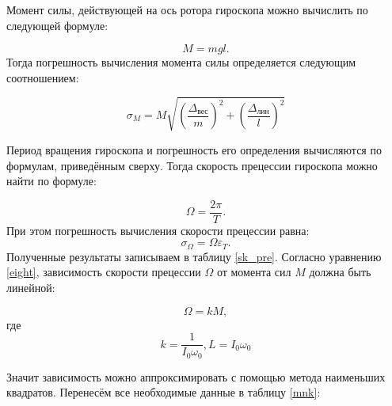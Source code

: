\documentclass[a4paper, 12pt]{article}
\begin{document}
\begin{center}
    Момент силы, действующей на ось ротора гироскопа можно вычислить по следующей формуле:

    \begin{equation}
        M = mgl.
    \end{equation}
    Тогда погрешность вычисления момента силы определяется следующим соотношением:
    
    \begin{equation}
        \sigma_M = M\sqrt{\left( \frac{\Delta_\text{вес}}{m} \right)^2 + \left( \frac{\Delta_\text{лин}}{l} \right)^2}
    \end{equation}
    
    Период вращения гироскопа и погрешность его определения вычисляются по формулам, приведённым сверху.
    Тогда скорость прецессии гироскопа можно найти по формуле:
    
    \begin{equation}
        \Omega = \frac{2\pi}{T}.
    \end{equation}
    При этом погрешность вычисления скорости прецессии равна:
    \begin{equation}
        \sigma_\Omega = \Omega \varepsilon_T.
    \end{equation}
    Полученные результаты записываем в таблицу \ref{sk_pre}.
    \bigskip
    Согласно уравнению \eqref{eight}, зависимость скорости прецессии $ \Omega $ от момента сил $ M $ должна быть линейной:
    
    \begin{equation}
        \Omega = kM,
    \end{equation}
    где
    \begin{equation}
        k = \frac{1}{I_0\omega_0}, L = I_0\omega_0
    \end{equation}

    Значит зависимость можно аппроксимировать с помощью метода наименьших квадратов. Перенесём все необходимые данные в таблицу \ref{mnk}:


\end{center}
\end{document}
